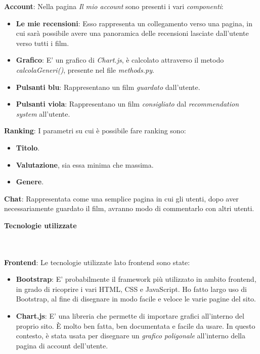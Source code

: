\documentclass[12pt]{article}
\begin{document}
	\noindent \textbf{Account}: Nella pagina \textit{Il mio account} sono presenti i vari \textit{componenti}:
	\begin{itemize}
		\item \textbf{Le mie recensioni}: Esso rappresenta un collegamento verso una pagina, in cui sarà possibile avere una panoramica delle recensioni lasciate dall'utente verso tutti i film.
		\item \textbf{Grafico}: E' un grafico di \textit{Chart.js}, è calcolato attraverso il metodo \textit{calcolaGeneri()}, presente nel file \textit{methods.py}.
		\item \textbf{Pulsanti blu}: Rappresentano un film \textit{guardato} dall'utente.
		\item \textbf{Pulsanti viola}: Rappresentano un film \textit{consigliato} dal \textit{recommendation system} all'utente.
	\end{itemize}
	
	\noindent \textbf{Ranking}: I parametri su cui è possibile fare ranking sono:
	\begin{itemize}
		\item \textbf{Titolo}.
		\item \textbf{Valutazione}, sia essa minima che massima.
		\item \textbf{Genere}. \\
	\end{itemize}
	
	\noindent \textbf{Chat}: Rappresentata come una semplice pagina in cui gli utenti, dopo aver necessariamente guardato il film, avranno modo di commentarlo con altri utenti.
	
	\pagebreak
	
	
	\noindent \centerline {\Huge \textbf{Tecnologie utilizzate}} \\ \\
	
	\noindent \textbf{Frontend}: Le tecnologie utilizzate lato frontend sono state: 
	\begin{itemize}
		\item \textbf{Bootstrap}: E' probabilmente il framework più utilizzato in ambito frontend, in grado di ricoprire i vari HTML, CSS e JavaScript. Ho fatto largo uso di Bootstrap, al fine di disegnare in modo facile e veloce le varie pagine del sito. \\
		
		\item \textbf{Chart.js}: E' una libreria che permette di importare grafici all'interno del proprio sito. È molto ben fatta, ben documentata e facile da usare. In questo contesto, è stata usata per disegnare un \textit{grafico poligonale} all'interno della pagina di account dell'utente. \\
	\end{itemize}
\end{document}
